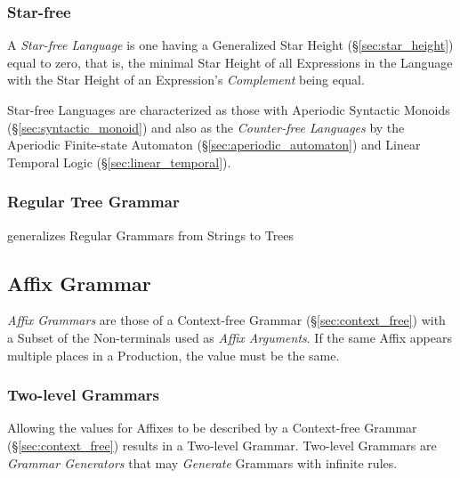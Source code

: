 \subsubsection{Star-free}\label{sec:starfree_grammar}

A \emph{Star-free Language} is one having a Generalized Star Height
(\S\ref{sec:star_height}) equal to zero, that is, the minimal Star Height of all
Expressions in the Language with the Star Height of an Expression's
\emph{Complement} being equal.

Star-free Languages are characterized as those with Aperiodic Syntactic Monoids
(\S\ref{sec:syntactic_monoid})\cite{schutzenberger65} and also as the
\emph{Counter-free Languages}\cite{mcnaughton-papert71} by the Aperiodic
Finite-state Automaton (\S\ref{sec:aperiodic_automaton}) and Linear Temporal
Logic (\S\ref{sec:linear_temporal}).



\subsubsection{Regular Tree Grammar}\label{sec:regular_tree_grammar}

generalizes Regular Grammars from Strings to Trees



\subsection{Affix Grammar}\label{sec:affix_grammar}

\emph{Affix Grammars} are those of a Context-free Grammar
(\S\ref{sec:context_free}) with a Subset of the Non-terminals used as
\emph{Affix Arguments}. If the same Affix appears multiple places in a
Production, the value must be the same.



\subsubsection{Two-level Grammars}\label{sec:two_level_grammar}

Allowing the values for Affixes to be described by a Context-free Grammar
(\S\ref{sec:context_free}) results in a Two-level Grammar. Two-level Grammars
are \emph{Grammar Generators} that may \emph{Generate} Grammars with infinite
rules.



